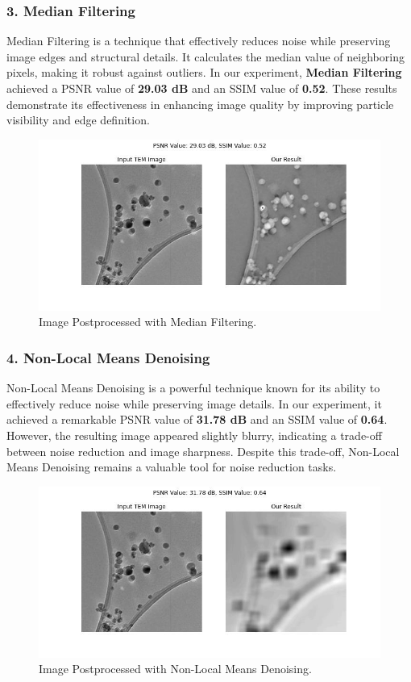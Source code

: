 \subsubsection{3. Median Filtering}
Median Filtering is a technique that effectively reduces noise while preserving image edges and structural details. It calculates the median value of neighboring pixels, making it robust against outliers. In our experiment, \textbf{Median Filtering} achieved a PSNR value of \textbf{29.03 dB} and an SSIM value of \textbf{0.52}. These results demonstrate its effectiveness in enhancing image quality by improving particle visibility and edge definition.

\begin{figure}[H]
\centering
\includegraphics[width=.9\textwidth]{img/Dataset_3_with_median_filter.jpg}
\caption{Image Postprocessed with Median Filtering.}\label{fig:Dataset_3_Median_Filtering}
\end{figure}

\subsubsection{4. Non-Local Means Denoising}
Non-Local Means Denoising is a powerful technique known for its ability to effectively reduce noise while preserving image details. In our experiment, it achieved a remarkable PSNR value of \textbf{31.78 dB} and an SSIM value of \textbf{0.64}. However, the resulting image appeared slightly blurry, indicating a trade-off between noise reduction and image sharpness. Despite this trade-off, Non-Local Means Denoising remains a valuable tool for noise reduction tasks.

\begin{figure}[H]
\centering
\includegraphics[width=.9\textwidth]{img/Dataset_3_with_non_local_means.jpg}
\caption{Image Postprocessed with Non-Local Means Denoising.}\label{fig:Dataset_3_Non_Local_Means_Denoising}
\end{figure}

